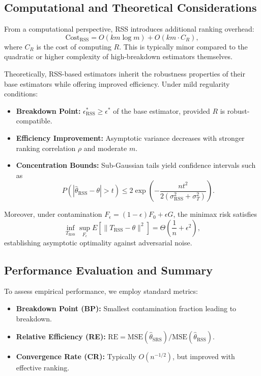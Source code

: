 \documentclass[12pt]{article}
\begin{document}
\subsection{Computational and Theoretical Considerations}

From a computational perspective, RSS introduces additional ranking overhead:
\[
\text{Cost}_{\text{RSS}} = O(km \log m) + O(km \cdot C_R),
\]
where $C_R$ is the cost of computing $R$. This is typically minor compared to the quadratic or higher complexity of high-breakdown estimators themselves.

Theoretically, RSS-based estimators inherit the robustness properties of their base estimators while offering improved efficiency. Under mild regularity conditions:
\begin{itemize}
    \item \textbf{Breakdown Point:} $\epsilon^*_{\text{RSS}} \geq \epsilon^*$ of the base estimator, provided $R$ is robust-compatible.
    \item \textbf{Efficiency Improvement:} Asymptotic variance decreases with stronger ranking correlation $\rho$ and moderate $m$.
    \item \textbf{Concentration Bounds:} Sub-Gaussian tails yield confidence intervals such as
    \[
    P(|\hat{\theta}_{\text{RSS}} - \theta| > t) \leq 2 \exp\left(-\frac{nt^2}{2(\sigma^2_{\text{RSS}} + \sigma^2_T)}\right).
    \]
\end{itemize}

Moreover, under contamination $F_\epsilon = (1-\epsilon)F_0 + \epsilon G$, the minimax risk satisfies
\[
\inf_{T_{\text{RSS}}} \sup_{F_\epsilon} E[\|T_{\text{RSS}} - \theta\|^2] = \Theta\left(\frac{1}{n} + \epsilon^2\right),
\]
establishing asymptotic optimality against adversarial noise.

\subsection{Performance Evaluation and Summary}

To assess empirical performance, we employ standard metrics:
\begin{itemize}
    \item \textbf{Breakdown Point (BP):} Smallest contamination fraction leading to breakdown.
    \item \textbf{Relative Efficiency (RE):} $\text{RE} = \text{MSE}(\hat{\theta}_{\text{SRS}})/\text{MSE}(\hat{\theta}_{\text{RSS}})$.
    \item \textbf{Convergence Rate (CR):} Typically $O(n^{-1/2})$, but improved with effective ranking.
\end{itemize}
\end{document}

